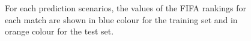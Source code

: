 \documentclass{statsoc}
\begin{document}
\begin{center}
\begin{figure}
\centering
{}
\caption{For each prediction scenarios, the values of the FIFA rankings for each match are shown in blue colour for the training set and in orange colour for the test set.}
\label{Fig1}
\end{figure}
\end{center}
\end{document}
